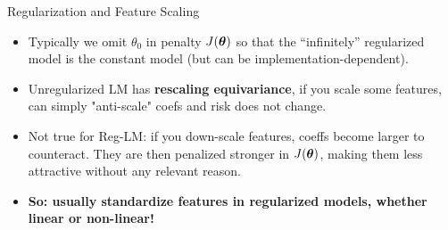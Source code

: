 \documentclass[11pt,compress,t,notes=noshow, xcolor=table]{beamer}
\begin{document}
\begin{vbframe}{Regularization and Feature Scaling}

  \begin{itemize}
    \item Typically we omit $\theta_0$ in penalty $J(\bm{\theta})$ so that the ``infinitely'' regularized model is the constant model (but can be implementation-dependent).
    \item Unregularized LM has \textbf{rescaling equivariance}, if you scale some features, can simply "anti-scale" coefs and risk does not change.
    \item Not true for Reg-LM: if you down-scale features, coeffs become larger to counteract. They are then penalized stronger in $J(\bm{\theta})$, making them less attractive without any relevant reason.
    \item \textbf{So: usually standardize features in regularized models, whether linear or non-linear!}  
      
  \end{itemize}

\framebreak



\end{vbframe}
\end{document}
